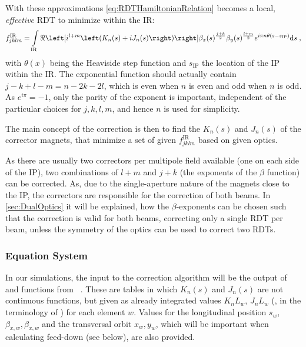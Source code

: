 With these approximations \cref{eq:RDTHamiltonianRelation} 
becomes a local, \textit{effective} RDT to minimize within the IR:
%
\begin{equation}
    \label{eq:effectiveRDT}
    f^\text{IR}_{jklm} =  \int\limits_\text{IR} 
    \ReOf{    
     i^{l+m}
     \left(K_{n}(s) + iJ_{n}(s) \right) 
    }
        \beta_x(s)^{\frac{j+k}{2}}
        \beta_y(s)^{\frac{l+m}{2}} 
     e^{i \pi n \theta(s - s_\text{IP})}
    \mathrm{d}s \; ,
\end{equation}
%
with $\theta(x)$ being the Heaviside step function and $s_\text{IP}$ the location of 
the IP within the IR.
The exponential function should actually contain $j - k + l - m = n - 2k - 2l$, 
which is even when $n$ is even and odd when $n$ is odd. 
As $e^{i\pi} = -1$, only the parity of the exponent is important, 
independent of the particular choices for $j,k,l,m$,
and hence $n$ is used for simplicity.

The main concept of the correction is then to find the $K_n(s)$ and $J_n(s)$ of 
the corrector magnets, that minimize a set of given $f^\text{IR}_{jklm}$ based on given optics.

As there are usually two correctors per multipole field available (one on each side of the IP), 
two combinations of $l+m$ and $j+k$ (the exponents of the $\beta$ function)
can be corrected.
As, due to the single-aperture nature of the magnets close to the IP,
the correctors are responsible for the correction of both beams.
In \cref{sec:DualOptics} it will be explained, how
the $\beta$-exponents can be chosen such that the correction is valid for both beams, 
correcting only a single RDT per beam,
unless the symmetry of the optics can be used to correct two RDTs. 



\subsubsection{Equation System}

In our simulations, the input to the correction algorithm will be the output 
of  and  functions from ~\cite{CERNMadX}.
These are tables in which $K_n(s)$ and $J_n(s)$ are not continuous functions, 
but given as already integrated values $K_nL_w$, $J_nL_w$ 
(,  in the terminology of ) for each element $w$.
Values for the longitudinal position $s_w$, $\beta_{x,w}, \beta_{x,w}$ and the transversal orbit $x_w, y_w$, which will be important 
when calculating feed-down (see below), are also provided.

